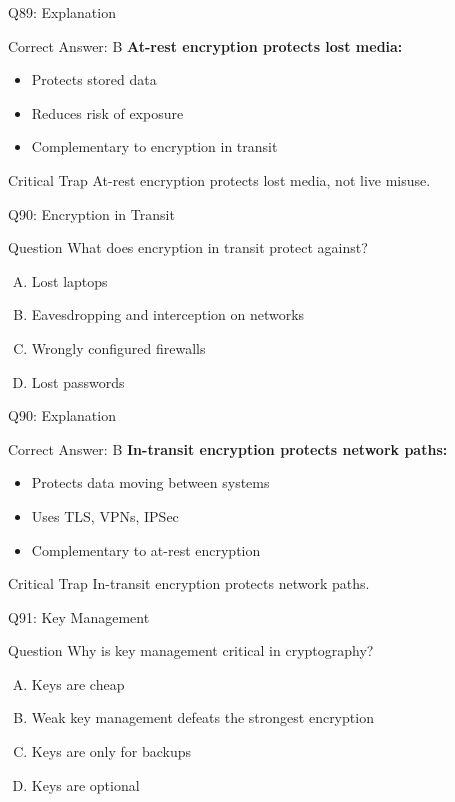 \documentclass{beamer}
\begin{document}
	\begin{frame}{Q89: Explanation}
		\begin{block}{Correct Answer: B}
			\textbf{At-rest encryption protects lost media:}
			\begin{itemize}
				\item Protects stored data
				\item Reduces risk of exposure
				\item Complementary to encryption in transit
			\end{itemize}
		\end{block}
		\begin{alertblock}{Critical Trap}
			At-rest encryption protects lost media, not live misuse.
		\end{alertblock}
	\end{frame}
	
	\begin{frame}{Q90: Encryption in Transit}
		\begin{block}{Question}
			What does encryption in transit protect against?
		\end{block}
		\begin{enumerate}[(A)]
			\item Lost laptops
			\item Eavesdropping and interception on networks
			\item Wrongly configured firewalls
			\item Lost passwords
		\end{enumerate}
	\end{frame}
	
	\begin{frame}{Q90: Explanation}
		\begin{block}{Correct Answer: B}
			\textbf{In-transit encryption protects network paths:}
			\begin{itemize}
				\item Protects data moving between systems
				\item Uses TLS, VPNs, IPSec
				\item Complementary to at-rest encryption
			\end{itemize}
		\end{block}
		\begin{alertblock}{Critical Trap}
			In-transit encryption protects network paths.
		\end{alertblock}
	\end{frame}
	
	\begin{frame}{Q91: Key Management}
		\begin{block}{Question}
			Why is key management critical in cryptography?
		\end{block}
		\begin{enumerate}[(A)]
			\item Keys are cheap
			\item Weak key management defeats the strongest encryption
			\item Keys are only for backups
			\item Keys are optional
		\end{enumerate}
	\end{frame}
	
\end{document}
